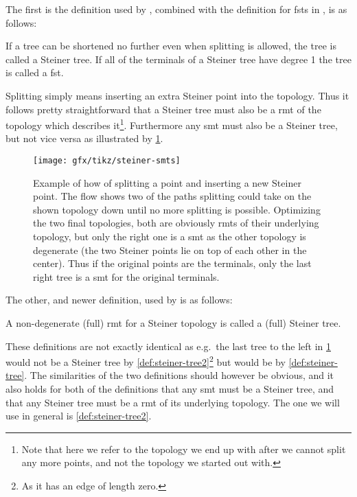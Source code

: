 The first is the definition used by \textcite{gilbert1968}, combined with the
definition for \acp{fst} in \textcite{smith1992}, is as follows:
%
\begin{definition}
  If a tree can be shortened no further even when splitting is allowed, the tree
  is called a Steiner tree. If all of the terminals of a Steiner tree have
  degree 1 the tree is called a \acl{fst}.\label{def:steiner-tree}
\end{definition}
%
Splitting simply means inserting an extra Steiner point into the topology. Thus
it follows pretty straightforward that a Steiner tree must also be a \ac{rmt} of
the topology which describes it\footnote{Note that here we refer to the topology
  we end up with after we cannot split any more points, and not the topology we
  started out with.}. Furthermore any \ac{smt} must also be a Steiner tree, but
not vice versa as illustrated by \cref{fig:steiner-smts}.
%
\begin{figure}[htbp]
  \centering
  \texttt{[image: gfx/tikz/steiner-smts]}
  \caption[Example of splitting and \acsp{rmt}]{Example of how of splitting a point
    and inserting a new Steiner point. The flow shows two of the paths splitting
    could take on the shown topology down until no more splitting is
    possible. Optimizing the two final topologies, both are obviously \acsp{rmt} of
    their underlying topology, but only the right one is a \acs{smt} as the other
    topology is degenerate (the two Steiner points lie on top of each other in the
    center). Thus if the original points are the terminals, only the last right
    tree is a \acs{smt} for the original terminals.\label{fig:steiner-smts}}
\end{figure}
%
The other, and newer definition, used by \textcite{brazil2015} is as follows:
%
\begin{definition}
  A non-degenerate (full) \ac{rmt} for a Steiner topology is called a (full)
  Steiner tree.\label{def:steiner-tree2}
\end{definition}
%
These definitions are not exactly identical as e.g.\ the last tree to the left
in \cref{fig:steiner-smts} would not be a Steiner tree by
\cref{def:steiner-tree2}\footnote{As it has an edge of length zero.}  but would
be by \cref{def:steiner-tree}. The similarities of the two definitions should
however be obvious, and it also holds for both of the definitions that any
\ac{smt} must be a Steiner tree, and that any Steiner tree must be a \ac{rmt} of
its underlying topology. The one we will use in general is
\cref{def:steiner-tree2}.

